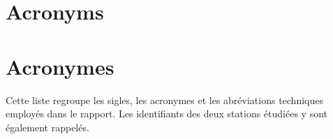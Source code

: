 \ifthenelse{\isundefined{\fr}}
{\chapter*{Acronyms}}
{\chapter*{Acronymes}}
\label{acronyms}
\ifthenelse{\isundefined{\fr}}
{}
{}
\thispagestyle{fancy}
\ifthenelse{\isundefined{\fr}}
{}
{}

Cette liste regroupe les sigles, les acronymes et les abréviations techniques
employés dans le rapport. Les identifiants des deux stations étudiées y sont
également rappelés.


